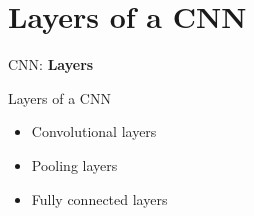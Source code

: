\section{Layers of a CNN}
\begin{frame}{}
    \LARGE CNN: \textbf{Layers}
\end{frame}

\begin{frame}{Layers of a CNN}
    \begin{itemize}
        \item Convolutional layers
        \item Pooling layers
        \item Fully connected layers
    \end{itemize}
\end{frame}




